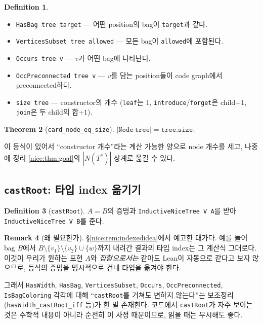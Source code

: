 \documentclass[11pt]{article}
\theoremstyle{definition}
\newtheorem{definition}{Definition}[section]
\newtheorem{remark}[definition]{Remark}
\theoremstyle{plain}
\newtheorem{theorem}[definition]{Theorem}
\newcommand{\lean}[1]{\texttt{#1}}
\begin{document}
\begin{definition}
\label{nice:def:codepredicates}
\begin{itemize}
  \item \lean{HasBag tree target} --- 어떤 position의 bag이 \lean{target}과 같다.
  \item \lean{VerticesSubset tree allowed} --- 모든 bag이 \lean{allowed}에
    포함된다.
  \item \lean{Occurs tree v} --- $v$가 어떤 bag에 나타난다.
  \item \lean{OccPreconnected tree v} --- $v$를 담는 position들이 code graph에서
    preconnected하다.
  \item \lean{size tree} --- constructor의 개수 (\lean{leaf}는 $1$,
    \lean{introduce}/\lean{forget}은 child$+1$, \lean{join}은 두 child의 합$+1$).
\end{itemize}
\end{definition}

\begin{theorem}[\lean{card\_node\_eq\_size}]
\label{nice:thm:cardsize}
$|\lean{Node}\ \lean{tree}| = \lean{tree}.\lean{size}$.
\end{theorem}

이 등식이 있어서 ``constructor 개수''라는 계산 가능한 양으로 node 개수를 세고,
나중에 정리 \ref{nice:thm:goal}의 $|N(T^\ast)|$ 상계로 옮길 수 있다.

\subsection{\lean{castRoot}: 타입 index 옮기기}

\begin{definition}[\lean{castRoot}]
\label{nice:def:castroot}
$A = B$의 증명과 \lean{InductiveNiceTree V A}를 받아
\lean{InductiveNiceTree V B}를 준다.
\end{definition}

\begin{remark}[왜 필요한가]
\label{nice:rem:castrootwhy}
\S\ref{nice:rem:indexedidea}에서 예고한 대가다. 예를 들어 bag $B$에서
$B \setminus \{v_1\} \setminus \{v_2\} \cup \{w\}$까지 내려간 결과의 타입 index는
그 계산식 그대로다. 이것이 우리가 원하는 표현 $A$와 \emph{집합으로서는} 같아도
Lean이 자동으로 같다고 보지 않으므로, 등식의 증명을 명시적으로 건네
타입을 옮겨야 한다.

그래서 \lean{HasWidth}, \lean{HasBag}, \lean{VerticesSubset}, \lean{Occurs},
\lean{OccPreconnected}, \lean{IsBagColoring} 각각에 대해
``\lean{castRoot}를 거쳐도 변하지 않는다''는 보조정리
(\lean{hasWidth\_castRoot\_iff} 등)가 한 벌 존재한다. 코드에서
\lean{castRoot}가 자주 보이는 것은 수학적 내용이 아니라 순전히 이 사정
때문이므로, 읽을 때는 무시해도 좋다.
\end{remark}
\end{document}
